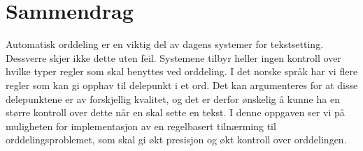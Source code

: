 \chapter{Sammendrag}

Automatisk orddeling er en viktig del av dagens systemer for tekstsetting.  Dessverre skjer ikke dette uten feil. Systemene tilbyr heller ingen kontroll over hvilke typer regler som skal benyttes ved orddeling. I det norske språk har vi flere regler som kan gi opphav til delepunkt i et ord. Det kan argumenteres for at disse delepunktene er av forskjellig kvalitet, og det er derfor ønskelig å kunne ha en større kontroll over dette når en skal sette en tekst. I denne oppgaven ser vi på muligheten for implementasjon av en regelbasert tilnærming til orddelingsproblemet, som skal gi økt presisjon og økt kontroll over orddelingen.